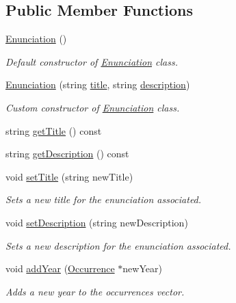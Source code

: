 \subsection*{Public Member Functions}
\begin{DoxyCompactItemize}
\item 
\hyperlink{class_enunciation_a78a6f3656b8d057dfef51593de59193f}{Enunciation} ()
\begin{DoxyCompactList}\small\item\em Default constructor of \hyperlink{class_enunciation}{Enunciation} class. \end{DoxyCompactList}\item 
\hyperlink{class_enunciation_a954fa90c85714409ab224e6f405c26e4}{Enunciation} (string \hyperlink{class_enunciation_a5e2accd01df4c81578dc8f7b83507167}{title}, string \hyperlink{class_enunciation_a0b30051b66bd07b227f6a227befb6c0c}{description})
\begin{DoxyCompactList}\small\item\em Custom constructor of \hyperlink{class_enunciation}{Enunciation} class. \end{DoxyCompactList}\item 
string \hyperlink{class_enunciation_a7db0b7bc585b133d7faae9a7a8f78be6}{get\+Title} () const
\item 
string \hyperlink{class_enunciation_a8f5a6300cf6eb691ca1600191bf20e5e}{get\+Description} () const
\item 
void \hyperlink{class_enunciation_a84cebe1417311997307664608305b305}{set\+Title} (string new\+Title)
\begin{DoxyCompactList}\small\item\em Sets a new title for the enunciation associated. \end{DoxyCompactList}\item 
void \hyperlink{class_enunciation_ae3a90d3e7ed1072d44c9801c689aa08f}{set\+Description} (string new\+Description)
\begin{DoxyCompactList}\small\item\em Sets a new description for the enunciation associated. \end{DoxyCompactList}\item 
void \hyperlink{class_enunciation_a86a3547dd604f7050a5e12b473ba6eef}{add\+Year} (\hyperlink{class_occurrence}{Occurrence} $\ast$new\+Year)
\begin{DoxyCompactList}\small\item\em Adds a new year to the occurrences vector. \end{DoxyCompactList}\item 

\end{DoxyCompactItemize}
